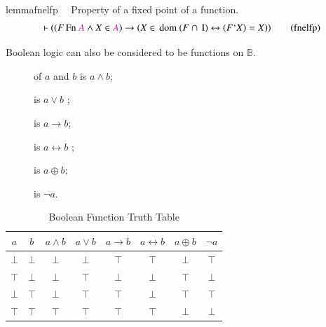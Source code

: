 \begin{restatable}{lemma}{fnelfp}~~ Property of a fixed point of a function. 
\begin{align}
\vdash ( ( F \,\mathrm{Fn}~ \mc{A} \wedge X \in \mc{A} ) \rightarrow ( X \in
    \,\mathrm{dom}~ ( F \cap \,\mathrm{I} ) \leftrightarrow ( F ` X ) = X )
    )\label{eq:fnelfp}\tag{fnelfp}
\end{align}
\end{restatable}

\pn Boolean logic can also be considered to be functions on $\mathbb{B}$.
\begin{description}
\item[] of $a$ and $b$ is $a\wedge b$; 
\item[] is $a\vee b$ ; 
\item[] is $a\rightarrow b$; 
\item[] is $a\leftrightarrow b$ ; 
\item[] is $a\oplus b$;
\item[] is $\neg a$.
\end{description}

\begin{table}[htp]
\caption{Boolean Function Truth Table}
\begin{center}
\begin{tabular}{|c|c||c|c|c|c|c|c|}
\hline
$a$ & $b$ & $a\wedge b$ & $a\vee b$ & $a\rightarrow b$ & $a\leftrightarrow b$ & $a\oplus b$ & $\neg a$ \\  \hline 
$\bot$ & $\bot$ & $\bot$ & $\bot$ & $\top$ & $\top$ & $\bot$ &  $\top$  \\ \hline 
$\top$ & $\bot$ & $\bot$ & $\top$ & $\bot$ & $\bot$ & $\top$ & $\bot$   \\ \hline 
$\bot$ & $\top$ & $\bot$ & $\top$ & $\top$ & $\bot$ & $\top$ &  $\top$  \\ \hline 
$\top$ & $\top$ & $\top$ & $\top$ & $\top$ & $\top$ & $\bot$ &  $\bot$  \\ \hline 
\end{tabular}
\end{center}
\label{default}
\end{table}%

